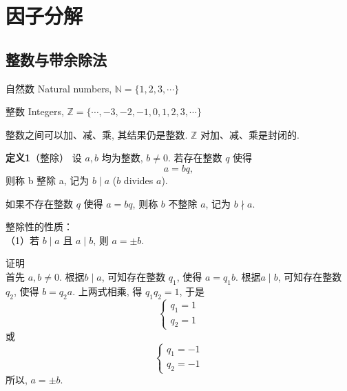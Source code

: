 \section{因子分解}
\subsection{整数与带余除法}

自然数 Natural numbers, 
$ \mathbb{N} = \{ 1, 2, 3, \cdots \} $

整数 Integers, 
$ \mathbb{Z} = \{ \cdots, -3, -2, -1, 0, 1, 2, 3, \cdots \} $

整数之间可以加、减、乘, 其结果仍是整数. $ \mathbb{Z} $ 对加、减、乘是封闭的. 

\textbf{定义1}（整除） 设 $a, b$ 均为整数, $ b \neq 0 $. 若存在整数 $ q $ 使得
\[ 
    a = bq,
\]
则称 b 整除 a, 记为 $ b \mid a $ ($b$ divides $a$). 

如果不存在整数 $q$ 使得 $a=bq$, 则称 $b$ 不整除 $a$, 记为 $b \nmid a$. 

整除性的性质：\\
（1）若 $ b \mid a $ 且 $ a \mid b$, 则 $a = \pm b$.

证明\\
首先 $a,b\neq 0$.
根据$ b \mid a $, 可知存在整数 $q_1$, 使得 $a=q_1 b$. 
根据$ a \mid b$, 可知存在整数 $q_2$, 使得 $b=q_2 a$. 
上两式相乘, 得 $q_1 q_2 = 1$, 于是\\
\[
    \left\{ 
        \begin{array}{lc}
            q_1 = 1\\
            q_2 = 1
        \end{array}
    \right.
\]
或
\[
    \left\{ 
        \begin{array}{lc}
            q_1 = -1\\
            q_2 = -1
        \end{array}
    \right.
\]
所以, $a = \pm b$.